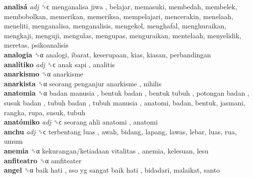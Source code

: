 \textbf{analisá} \emph{adj}  ␝ϲ   menganalisa jiwa , belajar, memasuki, membedah, membelek, membobolkan, memerikan, memeriksa, mempelajari, mencerakin, menelaah, meneliti, menganalisa, menganalisis, mengekol, menghafal, menghuraikan, mengkaji, menguji, mengulas, mengupas, menguraikan, mentelaah, menyelidik, meretas, psikoanalisis  \\
\textbf{analogia} ␝α  analogi, ibarat, keserupaan, kias, kiasan, perbandingan  \\
\textbf{analítiko} \emph{adj}  ␝ϲ   anak sapi , analitis  \\
\textbf{anarkismo} ␝α  anarkisme  \\
\textbf{anarkista} ␝α   seorang penganjur anarkisme , nihilis  \\
\textbf{anatomia} ␝α   badan manusia ,  bentuk badan ,  bentuk tubuh ,  potongan badan ,  susuk badan ,  tubuh badan ,  tubuh manusia , anatomi, badan, bentuk, jasmani, rangka, rupa, susuk, tubuh  \\
\textbf{anatómiko} \emph{adj}  ␝ϲ   seorang ahli anatomi , anatomi  \\
\textbf{anchu} \emph{adj}  ␝ϲ   terbentang luas , awah, bidang, lapang, lawas, lebar, luas, rua, umum  \\
\textbf{anemia} ␝α   kekurangan/ketiadaan vitalitas , anemia, kelesuan, lesu  \\
\textbf{anfiteatro} ␝α  amfiteater  \\
\textbf{angel} ␝α   baik hati ,  sso yg sangat baik hati , bidadari, malaikat, santo  \\
